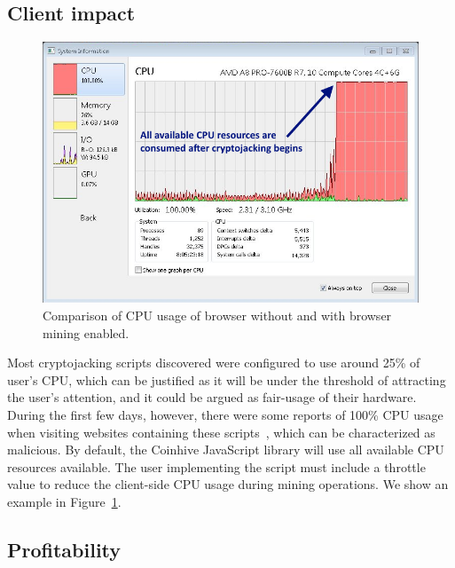 \subsection{Client impact}

\begin{figure}[t]
\centering
\includegraphics[width=\linewidth]{figures/windows_cpu_usage.png}
	\caption{Comparison of CPU usage of browser without and with browser mining enabled.}\label{fig:cpu}
\end{figure}

Most cryptojacking scripts discovered were configured to use around 25\% of user's CPU, which can be justified as it will be under the threshold of attracting the user's attention, and it could be argued as fair-usage of their hardware. During the first few days, however, there were some reports of 100\% CPU usage when visiting websites containing these scripts~\cite{piratesbayblog}, which can be characterized as malicious. By default, the Coinhive JavaScript library will use all available CPU resources available. The user implementing the script must include a throttle value to reduce the client-side CPU usage during mining operations. We show an example in Figure~\ref{fig:cpu}.


\subsection{Profitability}
\label{profitabilitexperiment}

